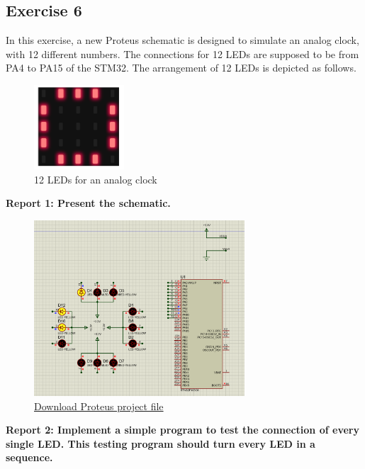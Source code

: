 \documentclass[twoside, final]{hcmut_report}
\begin{document}
\subsection{Exercise 6}
In this exercise, a new Proteus schematic is designed to simulate an analog clock, with 12 different numbers. The connections for 12 LEDs are supposed to be from PA4 to PA15 of the STM32. The arrangement of 12 LEDs is depicted as follows.

\begin{figure}[h!]
    \centering
    \includegraphics[width=0.3\textwidth]{graphics/f8.png}
    \caption{12 LEDs for an analog clock}
\end{figure}

\textbf{Report 1: Present the schematic.}
\begin{figure}[h!]
    \centering
    \includegraphics[width=0.7\textwidth]{graphics/f7.png}
    \caption{\href{https://github.com/batmaon512/Microcontroller-251/blob/main/Lab/Lab1_LED_Animations/Source_Proteus/EX6.pdsprj}{Download Proteus project file}}
\end{figure}

\textbf{Report 2: Implement a simple program to test the connection of every single LED. This testing program should turn every LED in a sequence.}
\end{document}
